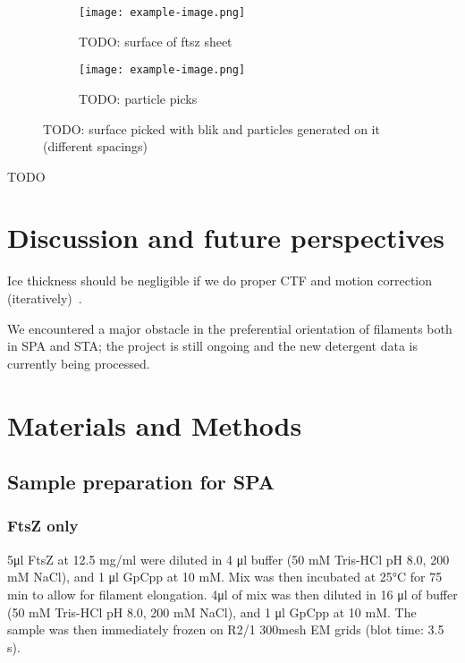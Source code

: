 \begin{figure}[ht]
    \centering
    \begin{subfigure}[B]{.5\textwidth}
        \centering
        \texttt{[image: example-image.png]}
        \caption{TODO: surface of ftsz sheet}
        \label{fig:ftsz_tomo_picks_surface}
    \end{subfigure}%
    \hfill
    \begin{subfigure}[B]{.5\textwidth}
        \centering
        \texttt{[image: example-image.png]}
        \caption{TODO: particle picks}
        \label{fig:ftsz_tomo_picks_particles}
    \end{subfigure}%
    \caption{TODO: surface picked with blik and particles generated on it (different spacings)}
    \label{fig:ftsz_tomo_picks}
\end{figure}

TODO

\section{Discussion and future perspectives}

Ice thickness should be negligible if we do proper CTF and motion correction (iteratively)~\cite{aiyerOvercomingResolutionAttenuation2024}.

We encountered a major obstacle in the preferential orientation of filaments both in SPA and STA; the project is still ongoing and the new detergent data is currently being processed.

\section{Materials and Methods}\label{ftsz_methods}

\subsection{Sample preparation for SPA}

\subsubsection{FtsZ only}
5μl FtsZ at 12.5 mg/ml were diluted in 4 μl buffer (50 mM Tris-HCl pH 8.0, 200 mM NaCl), and 1 μl GpCpp at 10 mM.
Mix was then incubated at 25°C for 75 min to allow for filament elongation.
4μl of mix was then diluted in 16 μl of buffer (50 mM Tris-HCl pH 8.0, 200 mM NaCl), and 1 μl GpCpp at 10 mM.
The sample was then immediately frozen on R2/1 300mesh EM grids (blot time: 3.5 s).

